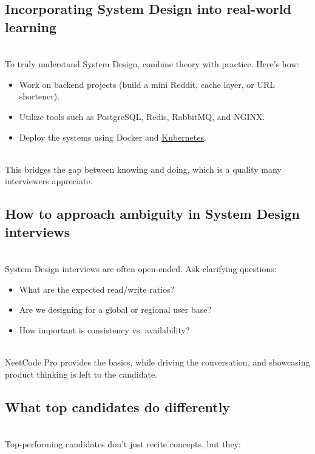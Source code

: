 \subsection{Incorporating System Design into real-world learning}\label{0D7Zwt3hfsS3XEXqCB2Uw}
\\
To truly understand System Design, combine theory with practice. Here's how:

\begin{itemize}
\item
\protect{}\label{e1HUUkt4c7_9JPYdWnIlQ}
Work on backend projects (build a mini Reddit, cache layer, or URL shortener).
\item
\protect{}\label{W0WeMhipfJ-nvorTzvyC3}
Utilize tools such as PostgreSQL, Redis, RabbitMQ, and NGINX.
\item
\protect{}\label{Ahb2Rzi2aBftJ2XWBf_JL}
Deploy the systems using Docker and \href{https://www.educative.io/courses/learn-kubernetes}{\ul{Kubernetes}}.
\end{itemize}
\\
This bridges the gap between knowing and doing, which is a quality many interviewers appreciate.

\subsection{How to approach ambiguity in System Design interviews}\label{e4jaUZL5z0eogbUPMAl2k}
\\
System Design interviews are often open-ended. Ask clarifying questions:

\begin{itemize}
\item
\protect{}\label{CVvGrDPzNlr7_9_nd5hZL}
What are the expected read/write ratios?
\item
\protect{}\label{7bIgbSEQ90JinbdMskxzb}
Are we designing for a global or regional user base?
\item
\protect{}\label{7UMsc5p83rT5zD2ndJa-u}
How important is consistency vs. availability?
\end{itemize}
\\
NeetCode Pro provides the basics, while driving the conversation, and showcasing product thinking is left to the candidate.

\subsection{What top candidates do differently}\label{1VIddkeP4FRHS51vlDHm-}
\\
Top-performing candidates don't just recite concepts, but they:

